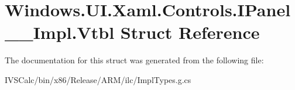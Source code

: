 \hypertarget{struct_windows_1_1_u_i_1_1_xaml_1_1_controls_1_1_i_panel_____impl_1_1_vtbl}{}\section{Windows.\+U\+I.\+Xaml.\+Controls.\+I\+Panel\+\_\+\+\_\+\+Impl.\+Vtbl Struct Reference}
\label{struct_windows_1_1_u_i_1_1_xaml_1_1_controls_1_1_i_panel_____impl_1_1_vtbl}


The documentation for this struct was generated from the following file\+:\begin{DoxyCompactItemize}
\item 
I\+V\+S\+Calc/bin/x86/\+Release/\+A\+R\+M/ilc/Impl\+Types.\+g.\+cs\end{DoxyCompactItemize}
